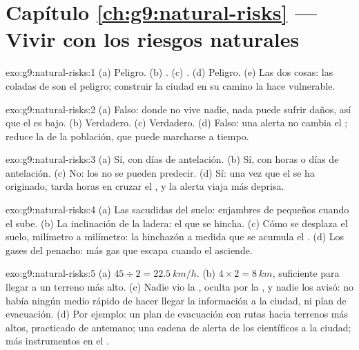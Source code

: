 \section*{Capítulo \ref{ch:g9:natural-risks} --- Vivir con los riesgos naturales}

\begin{solution}{exo:g9:natural-risks:1}
(a) Peligro. (b) . (c) . (d) Peligro. (e) Las
dos cosas: las coladas de  son el peligro; construir la ciudad en su
camino la hace vulnerable.
\end{solution}

\begin{solution}{exo:g9:natural-risks:2}
(a) Falso: donde no vive nadie, nada puede sufrir daños, así que el 
es bajo. (b) Verdadero. (c) Verdadero. (d) Falso: una alerta no cambia el
; reduce la  de la población, que puede marcharse a
tiempo.
\end{solution}

\begin{solution}{exo:g9:natural-risks:3}
(a) Sí, con días de antelación. (b) Sí, con horas o días de antelación.
(c) No: los  no se pueden predecir. (d) Sí: una vez que el
 se ha originado, tarda horas en cruzar el , y la alerta
viaja más deprisa.
\end{solution}

\begin{solution}{exo:g9:natural-risks:4}
(a) Las sacudidas del suelo: enjambres de pequeños  cuando el
 sube. (b) La inclinación de la ladera: el  que se hincha.
(c) Cómo se desplaza el suelo, milímetro a milímetro: la hinchazón a medida
que se acumula el . (d) Los gases del penacho: más gas que escapa
cuando el  asciende.
\end{solution}

\begin{solution}{exo:g9:natural-risks:5}
(a) $45 \div 2 = \qty{22.5}{km/h}$. (b) $4 \times 2 = \qty{8}{km}$,
suficiente para llegar a un terreno más alto. (c) Nadie vio la ,
oculta por la , y nadie los avisó: no había ningún medio rápido de
hacer llegar la información a la ciudad, ni plan de evacuación. (d) Por
ejemplo: un plan de evacuación con rutas hacia terrenos más altos,
practicado de antemano; una cadena de alerta de los científicos a la
ciudad; más instrumentos en el .
\end{solution}

